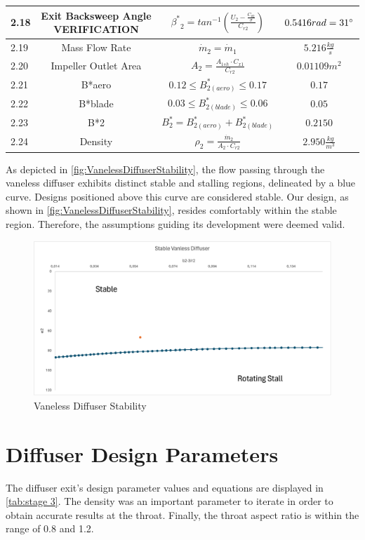\documentclass[12pt, letter]{report}
\begin{document}
\begin{table}[H]
\begin{tabular}{|l|c|c|c|}
 2.18& Exit Backsweep Angle VERIFICATION& ${\beta^*}_2=tan^{-1} (\frac{U_2-\frac{C_{\theta2}}{\sigma}}{C_{r2}})$& $0.5416rad=31\degree$\\\hline
 2.19& Mass Flow Rate& $\dot m_2= \dot m_1$& $5.216 \frac{kg}{s}$\\\hline
 2.20& Impeller Outlet Area& $A_2=\frac{A_{1sh} \cdot C_{x1}}{C_{r2}}$& $0.01109m^2$\\\hline
 2.21& B*aero& $0.12 \leq B^*_{2(aero)} \leq 0.17$& $0.17$\\\hline
 2.22& B*blade& $0.03 \leq B^*_{2(blade)} \leq 0.06$& $0.05$\\\hline
 2.23& B*2& $B^*_2=B^*_{2(aero)}+B^*_{2(blade)}$& $0.2150$\\\hline
 2.24& Density& $\rho_2=\frac{\dot m_2}{A_2 \cdot C_{r2}}$& $2.950\frac{kg}{m^3}$\\\hline
    \end{tabular}
    
    \label{tab:stage 2}
\end{table}

As depicted in \autoref{fig:VanelessDiffuserStability}, the flow passing through the vaneless diffuser exhibits distinct stable and stalling regions, delineated by a blue curve. Designs positioned above this curve are considered stable. Our design, as shown in \autoref{fig:VanelessDiffuserStability}, resides comfortably within the stable region. Therefore, the assumptions guiding its development were deemed valid.

\begin{figure}[H]
    \centering
    \includegraphics[width=1\textwidth]{figures/StableVanlessDiffuser.png}
    \caption{Vaneless Diffuser Stability \cite{lectureslides}}
    \label{fig:VanelessDiffuserStability}
\end{figure}

\section{Diffuser Design Parameters}
The diffuser exit's design parameter values and equations are displayed in \autoref{tab:stage 3}. The density was an important parameter to iterate in order to obtain accurate results at the throat. Finally, the throat aspect ratio is within the range of 0.8 and 1.2.
\end{document}
